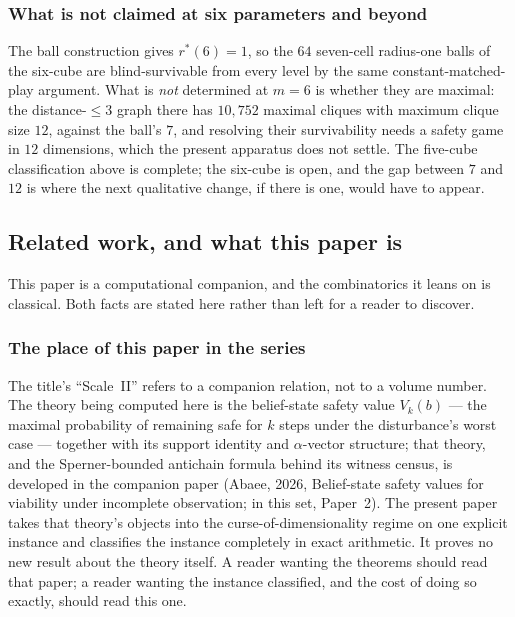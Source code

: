 \documentclass[10pt,twocolumn]{article}
\theoremstyle{plain}
\theoremstyle{definition}
\theoremstyle{remark}
\begin{document}
\subsubsection{What is not claimed at six parameters and beyond}

The ball construction gives \(r^{*}(6) = 1\), so the \(64\) seven-cell radius-one balls of
the six-cube are blind-survivable from every level by the same constant-matched-play
argument. What is \emph{not} determined at \(m = 6\) is whether they are maximal: the
distance-\(\le 3\) graph there has \(10{,}752\) maximal cliques with maximum clique size
\(12\), against the ball's \(7\), and resolving their survivability needs a safety game in
\(12\) dimensions, which the present apparatus does not settle. The five-cube classification
above is complete; the six-cube is open, and the gap between \(7\) and \(12\) is where the
next qualitative change, if there is one, would have to appear.

\subsection{Related work, and what this paper is}
\label{scale-priorart}

This paper is a computational companion, and the combinatorics it leans on is classical.
Both facts are stated here rather than left for a reader to discover.

\subsubsection{The place of this paper in the series}

The title's ``Scale~II'' refers to a companion relation, not to a volume number. The
theory being computed here is the belief-state safety value \(V_k(b)\) --- the maximal
probability of remaining safe for \(k\) steps under the disturbance's worst case --- together
with its support identity and \(\alpha\)-vector structure; that theory, and the
Sperner-bounded antichain formula behind its witness census, is developed in the companion
paper (Abaee, 2026, Belief-state safety values for viability under incomplete observation;
in this set, Paper~2). The present paper takes that theory's objects into the
curse-of-dimensionality regime on one explicit instance and classifies the instance
completely in exact arithmetic. It proves no new result about the theory itself. A reader
wanting the theorems should read that paper; a reader wanting the instance classified, and
the cost of doing so exactly, should read this one.
\end{document}
